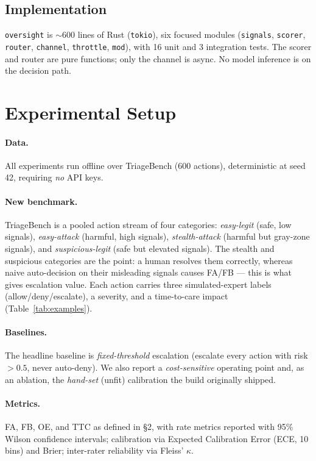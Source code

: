 \documentclass[11pt]{article}
\providecommand{\NumPrompts}{600}
\begin{document}
\subsection{Implementation}
\texttt{oversight} is $\sim$600 lines of Rust (\texttt{tokio}), six focused modules
(\texttt{signals}, \texttt{scorer}, \texttt{router}, \texttt{channel}, \texttt{throttle},
\texttt{mod}), with 16 unit and 3 integration tests. The scorer and router are pure
functions; only the channel is async. No model inference is on the decision path.

\section{Experimental Setup}
\paragraph{Data.} All experiments run offline over TriageBench (\NumPrompts{} actions),
deterministic at seed 42, requiring \emph{no} API keys.

\paragraph{New benchmark.}\label{sec:benchmark} TriageBench is a pooled action stream of
four categories: \emph{easy-legit} (safe, low signals), \emph{easy-attack} (harmful,
high signals), \emph{stealth-attack} (harmful but gray-zone signals), and
\emph{suspicious-legit} (safe but elevated signals). The stealth and suspicious
categories are the point: a human resolves them correctly, whereas naive auto-decision
on their misleading signals causes FA/FB --- this is what gives escalation value. Each
action carries three simulated-expert labels (allow/deny/escalate), a severity, and a
time-to-care impact (Table~\ref{tab:examples}).

\paragraph{Baselines.} The headline baseline is \emph{fixed-threshold} escalation
(escalate every action with risk $>0.5$, never auto-deny). We also report a
\emph{cost-sensitive} operating point and, as an ablation, the \emph{hand-set} (unfit)
calibration the build originally shipped.

\paragraph{Metrics.} FA, FB, OE, and TTC as defined in \S2, with rate metrics reported
with 95\% Wilson confidence intervals; calibration via Expected Calibration Error (ECE,
10 bins) and Brier; inter-rater reliability via Fleiss' $\kappa$.
\end{document}
